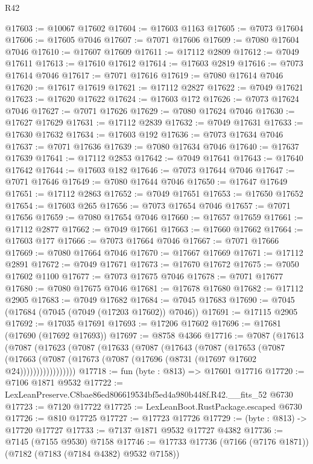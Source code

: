 \begin{lexlean}{R42}
\begin{coremodule}
{@17603 := @10067 @17602
@17604 := @17603 @1163
@17605 := @7073 @17604
@17606 := @17605 @7046
@17607 := @7071 @17606
@17609 := @7080 @17604 @7046
@17610 := @17607 @17609
@17611 := @17112 @2809
@17612 := @7049 @17611
@17613 := @17610 @17612
@17614 := @17603 @2819
@17616 := @7073 @17614 @7046
@17617 := @7071 @17616
@17619 := @7080 @17614 @7046
@17620 := @17617 @17619
@17621 := @17112 @2827
@17622 := @7049 @17621
@17623 := @17620 @17622
@17624 := @17603 @172
@17626 := @7073 @17624 @7046
@17627 := @7071 @17626
@17629 := @7080 @17624 @7046
@17630 := @17627 @17629
@17631 := @17112 @2839
@17632 := @7049 @17631
@17633 := @17630 @17632
@17634 := @17603 @192
@17636 := @7073 @17634 @7046
@17637 := @7071 @17636
@17639 := @7080 @17634 @7046
@17640 := @17637 @17639
@17641 := @17112 @2853
@17642 := @7049 @17641
@17643 := @17640 @17642
@17644 := @17603 @182
@17646 := @7073 @17644 @7046
@17647 := @7071 @17646
@17649 := @7080 @17644 @7046
@17650 := @17647 @17649
@17651 := @17112 @2863
@17652 := @7049 @17651
@17653 := @17650 @17652
@17654 := @17603 @265
@17656 := @7073 @17654 @7046
@17657 := @7071 @17656
@17659 := @7080 @17654 @7046
@17660 := @17657 @17659
@17661 := @17112 @2877
@17662 := @7049 @17661
@17663 := @17660 @17662
@17664 := @17603 @177
@17666 := @7073 @17664 @7046
@17667 := @7071 @17666
@17669 := @7080 @17664 @7046
@17670 := @17667 @17669
@17671 := @17112 @2891
@17672 := @7049 @17671
@17673 := @17670 @17672
@17675 := @7050 @17602 @1100
@17677 := @7073 @17675 @7046
@17678 := @7071 @17677
@17680 := @7080 @17675 @7046
@17681 := @17678 @17680
@17682 := @17112 @2905
@17683 := @7049 @17682
@17684 := @7045 @17683
@17690 := @7045 (@17684 (@7045 (@7049 (@17203 @17602)) @7046))
@17691 := @17115 @2905
@17692 := @17035 @17691
@17693 := @17206 @17602
@17696 := @17681 (@17690 (@17692 @17693))
@17697 := @8758 @4366
@17716 := @7087
    (@17613
      (@7087
        (@17623
          (@7087
            (@17633
              (@7087
                (@17643
                  (@7087
                    (@17653
                      (@7087
                        (@17663
                          (@7087 (@17673 (@7087 (@17696 (@8731 (@17697 @17602 @24)))))))))))))))))
@17718 := fun (byte : @813) => @17601 @17716
@17720 := @7106 @1871 @9532
@17722 := LexLeanPreserve.C8bae86ed806619534bf5ed4a980b448f.R42.__fits_52 @6730
@17723 := @7120 @17722
@17725 := LexLeanBoot.RustPackage.escaped @6730
@17726 := @810 @17725
@17727 := @17723 @17726
@17729 := (byte : @813) -> @17720 @17727
@17733 := @7137 @1871 @9532 @17727 @4382
@17736 := @7145 (@7155 @9530) @7158
@17746 := @17733 @17736 (@7166 (@7176 @1871)) (@7182 (@7183 (@7184 @4382) @9532 @7158))
}
\end{coremodule}
\end{lexlean}
